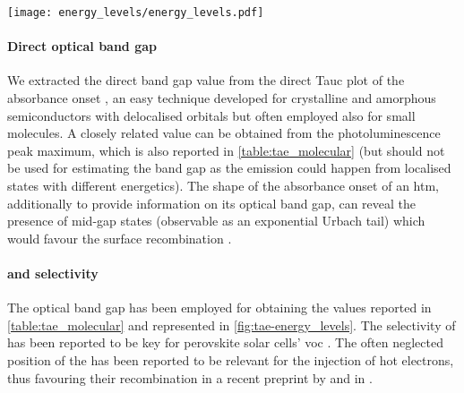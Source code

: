 	\begin{SCfigure}
		\centering
		\texttt{[image: energy\_levels/energy\_levels.pdf]}
		\label{fig:tae-energy_levels}
	\end{SCfigure}

	\paragraph{Direct optical band gap}
	We extracted the direct band gap value from the direct Tauc plot of the absorbance onset \cite{WikipediaTauc}, an easy technique developed for crystalline and amorphous semiconductors \cite{Stenzel2005} with delocalised orbitals but often employed also for small molecules.
	A closely related value can be obtained from the photoluminescence peak maximum, which is also reported in \cref{table:tae_molecular} (but should not be used for estimating the band gap as the emission could happen from localised states with different energetics).
	The shape of the absorbance onset of an \gls{htm}, additionally to provide information on its optical band gap, can reveal the presence of mid-gap states (observable as an exponential Urbach tail) which would favour the surface recombination \cite{Tvingstedt2017}.

	\paragraph{ and selectivity}
	The optical band gap has been employed for obtaining the  values reported in \cref{table:tae_molecular} and represented in \cref{fig:tae-energy_levels}.
	The selectivity of  has been reported to be key for perovskite solar cells' \gls{voc} \cite{Stolterfoht2018a}.
	The often neglected position of the   has been reported to be relevant for the injection of hot electrons, thus favouring their recombination in a recent preprint by  and in .

